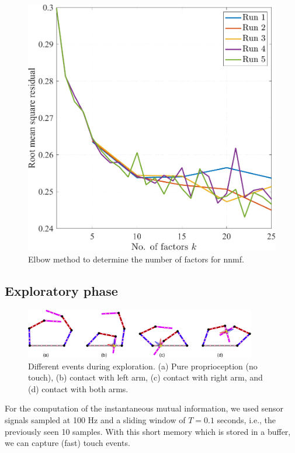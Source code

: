 \begin{figure}[!th]
	\begin{center}
		\hspace*{\fill}
		\includegraphics[width=0.99\columnwidth]{nnmf_elbow.pdf}
		\hspace*{\fill}
	\end{center}
	\caption{\label{fig:nnmf_elbow} Elbow method to determine the number of factors for \ac{nnmf}.}
\end{figure}

\subsection{Exploratory phase}
\begin{figure}[!ht]
	\centering
	\includegraphics[width=0.9\textwidth]{planar_dual_arm_modes.pdf}
	\caption{Different events during exploration. (a) Pure proprioception (no touch), (b) contact with left arm, (c) contact with right arm, and (d) contact with both arms.}
	\label{fig:planar_dual_arm_modes}
\end{figure}
For the computation of the instantaneous mutual information, we used sensor signals sampled at 100 Hz and a sliding window of $T = 0.1$ seconds, i.e., the previously seen 10 samples. With this short memory which is stored in a buffer, we can capture (fast) touch events.

